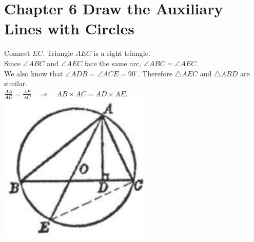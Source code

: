 \documentclass[10pt]{article}
\begin{document}
\section*{Chapter 6 Draw the Auxiliary Lines with Circles}
Connect \(E C\). Triangle \(A E C\) is a right triangle.\\
Since \(\angle A B C\) and \(\angle A E C\) face the same arc, \(\angle A B C=\angle A E C\).\\
We also know that \(\angle A D B=\angle A C E=90^{\circ}\). Therefore \(\triangle A E C\) and \(\triangle A B D\) are similar.\\
\(\frac{A B}{A D}=\frac{A E}{A C} \quad \Rightarrow \quad A B \times A C=A D \times A E\).\\
\includegraphics[max width=\textwidth, center]{2025_04_17_97bc1f7e44d93c271a88g-173}
\end{document}

